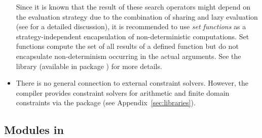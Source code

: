 \begin{itemize}
Since it is known that the result of these search operators might
depend on the evaluation strategy due to the combination of
sharing and lazy evaluation
(see \cite{BrasselHanusHuch04JFLP} for a detailed discussion),
it is recommended to use
\emph{set functions} \cite{AntoyHanus09}
as a strategy-independent encapsulation of non-deterministic
computations.
Set functions compute the set of all results of a defined function
but do not encapsulate non-determinism occurring in the actual arguments.
See the library 
(available in package ) for more details.
\item
There is no general connection to external constraint solvers.
However, the \CYS compiler provides constraint
solvers for arithmetic and finite domain constraints
via the package 
(see Appendix~\ref{sec:libraries}).
\end{itemize}

%



\subsection{Modules in \CYS}
\label{sec-modules}

